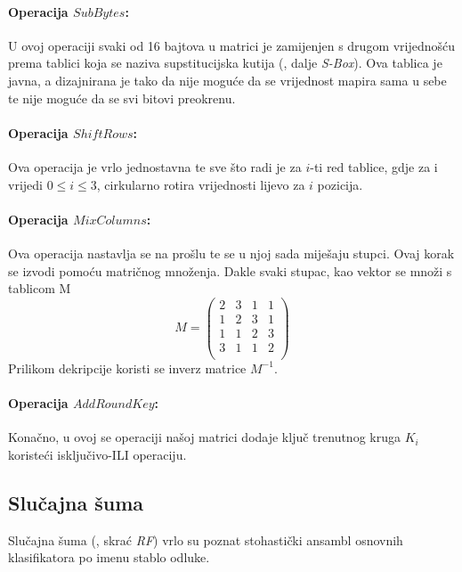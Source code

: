 \documentclass[times, utf8, diplomski]{fer}
\begin{document}
\paragraph{Operacija $SubBytes$:} U ovoj operaciji svaki od 16 bajtova u matrici je zamijenjen s drugom vrijednošću prema tablici koja se naziva supstitucijska kutija (, dalje \emph{S-Box}). Ova tablica je javna, a dizajnirana je tako da nije moguće da se vrijednost mapira sama u sebe te nije moguće da se svi bitovi preokrenu.

\paragraph{Operacija $ShiftRows$:} Ova operacija je vrlo jednostavna te sve što radi je za $i$-ti red tablice, gdje za i vrijedi $0 \le i \le 3$, cirkularno rotira vrijednosti lijevo za $i$ pozicija.

\paragraph{Operacija $MixColumns$:} Ova operacija nastavlja se na prošlu te se u njoj sada miješaju stupci. Ovaj korak se izvodi pomoću matričnog množenja. Dakle svaki stupac, kao vektor se množi s tablicom M
\[
    M =
    \begin{pmatrix}
        2 & 3 & 1 & 1 \\
        1 & 2 & 3 & 1 \\
        1 & 1 & 2 & 3 \\
        3 & 1 & 1 & 2 \\
    \end{pmatrix}
\]
Prilikom dekripcije koristi se inverz matrice $M^{-1}$.

\paragraph{Operacija $AddRoundKey$:} Konačno, u ovoj se operaciji našoj matrici dodaje ključ trenutnog kruga $K_i$ koristeći isključivo-ILI operaciju.

\subsection{Slučajna šuma}

Slučajna šuma (, skrać \emph{RF}) vrlo su poznat stohastički ansambl osnovnih klasifikatora po imenu stablo odluke.
\end{document}
